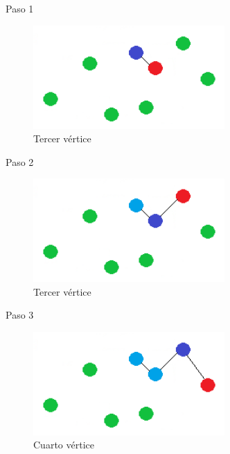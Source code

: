 \begin{frame}
	\begin{exampleblock}{Paso 1}
	\begin{figure}[htbH]
		\centering
		\includegraphics[width=0.65\textwidth]{./Imagenes/vecino1.png}
		\caption{Tercer vértice}
	\end{figure}
	\end{exampleblock}
\end{frame}

\begin{frame}
	\begin{exampleblock}{Paso 2}
	\begin{figure}[htbH]
		\centering
		\includegraphics[width=0.65\textwidth]{./Imagenes/vecino2.png}
		\caption{Tercer vértice}
	\end{figure}
	\end{exampleblock}
\end{frame}

\begin{frame}
	\begin{exampleblock}{Paso 3}
	\begin{figure}[htbH]
		\centering
		\includegraphics[width=0.65\textwidth]{./Imagenes/vecino3.png}
		\caption{Cuarto vértice}
	\end{figure}
	\end{exampleblock}
\end{frame}


